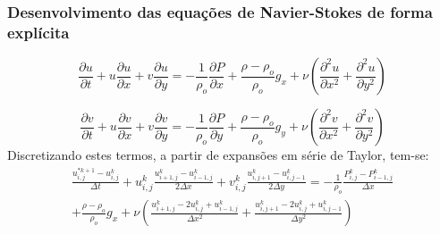 \documentclass[xcolor=dvipsnames,10pt,aspectratio=169]{beamer}
\begin{document}
	\begin{frame}
		\frametitle{Desenvolvimento das equações de Navier-Stokes de forma explícita}
		\centering
		\begin{equation}
			\frac{\partial u}{\partial t} + u\frac{\partial u}{\partial x} + v\frac{\partial u}{\partial y} =  -\frac{1}{\rho_o} \frac{\partial P}{\partial x} + \frac{\rho - 	\rho_o}{\rho_o} g_x + \nu \left( \frac{\partial ^2 u}{\partial x^2} + \frac{\partial ^2 u}{\partial y^2} \right)
		\end{equation}

		\begin{equation}
			\frac{\partial v}{\partial t} + u\frac{\partial v}{\partial x} + v\frac{\partial v}{\partial y} =  -\frac{1}{\rho_o} \frac{\partial P}{\partial y} + \frac{\rho - \rho_o}{\rho_o} g_y + \nu \left( \frac{\partial ^2 v}{\partial x^2} + \frac{\partial ^2 v}{\partial y^2} \right)
		\end{equation}
		Discretizando estes termos, a partir de expansões em série de Taylor, tem-se:
		\begin{equation}
			\begin{split}
			\frac{u_{i , j}^{\ast k + 1} - u_{i , j}^{k}}{\Delta t} + u_{i , j}^{k}\frac{u_{i + 1 , j}^k - u_{i - 1 , j}^k  }{2 \Delta x} + v_{i , j}^{k}\frac{u_{i , j+ 1}^k - u_{i, j-1}^k  }{2 \Delta y} =  -\frac{1}{\rho_o} \frac{P_{i, j}^k - P_{i - 1, j}^k}{\Delta x} \\ + \frac{\rho - 	\rho_o}{\rho_o} g_x + \nu \left( \frac{u_{i+1 , j}^{k} - 2 u_{i,j}^{k} + u_{i-1,j}^{k}}{\Delta x^2} + \frac{u_{i , j+1}^{k} - 2 u_{i,j}^{k} + u_{i,j-1}^{ k}}{\Delta y^2} \right)
			\end{split}
		\end{equation}


	\end{frame}
\end{document}
